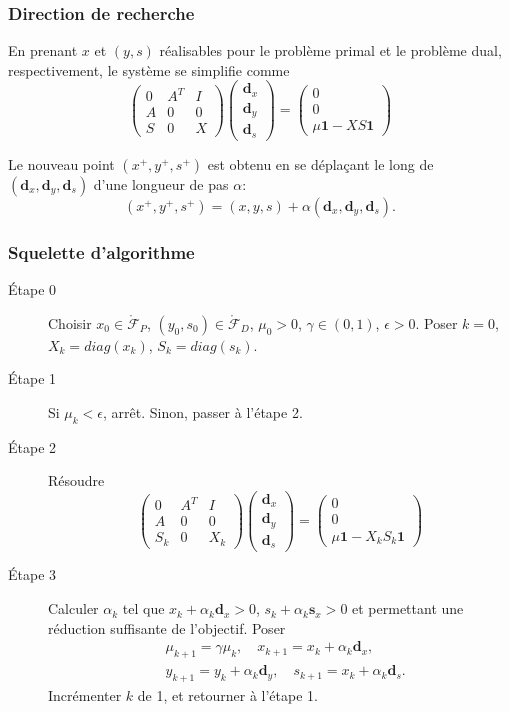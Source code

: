 \documentclass[usepdftitle=false, aspectratio=169]{beamer}
\def\bd{\boldsymbol{d}}
\def\bs{\boldsymbol{s}}
\def\bone{\boldsymbol{1}}
\begin{document}
\begin{frame}
\frametitle{Direction de recherche}

En prenant $x$ et $(y,s)$ réalisables pour le problème primal et le problème dual, respectivement, le système se simplifie comme
$$
\begin{pmatrix}
0 & A^T & I \\
A & 0 & 0 \\
S & 0 & X
\end{pmatrix}
\begin{pmatrix}
\bd_x \\ \bd_y \\ \bd_s
\end{pmatrix}
=
\begin{pmatrix}
0 \\ 0 \\ \mu\bone - XS\bone
\end{pmatrix}
$$

Le nouveau point $(x^+, y^+, s^+)$ est obtenu en se déplaçant le long de $(\bd_x, \bd_y, \bd_s)$ d'une longueur de pas $\alpha$:
$$
(x^+, y^+, s^+) = (x, y, s) + \alpha (\bd_x, \bd_y, \bd_s).
$$

\end{frame}

\begin{frame}
\frametitle{Squelette d'algorithme}

\begin{description}
	\item[Étape 0] Choisir $x_0 \in \mathring{\mathcal{F}}_P$, $(y_0, s_0) \in \mathring{\mathcal{F}}_D$, $\mu_0 > 0$, $\gamma \in (0,1)$, $\epsilon > 0$. Poser $k = 0$, $X_k = diag(x_k)$, $S_k = diag(s_k)$.
	\item[Étape 1] Si $\mu_k < \epsilon$, arrêt. Sinon, passer à l'étape 2.
	\item[Étape 2] Résoudre
$$
\begin{pmatrix}
	0 & A^T & I \\
	A & 0 & 0 \\
	S_k & 0 & X_k
\end{pmatrix}
\begin{pmatrix}
	\bd_x \\ \bd_y \\ \bd_s
\end{pmatrix}
=
\begin{pmatrix}
	0 \\ 0 \\ \mu\bone - X_kS_k\bone
\end{pmatrix}
$$
\item[Étape 3] Calculer $\alpha_k$ tel que $x_k + \alpha_k\bd_x > 0$, $s_k + \alpha_k\bs_x > 0$ et permettant une réduction suffisante de l'objectif. Poser
\begin{align*}
& \mu_{k+1} = \gamma \mu_k,\quad x_{k+1} = x_k + \alpha_k\bd_x, \\
& y_{k+1} = y_k + \alpha_k\bd_y,\quad s_{k+1} = x_k + \alpha_k\bd_s.
\end{align*}
Incrémenter $k$ de 1, et retourner à l'étape 1.
\end{description}

\end{frame}
\end{document}
